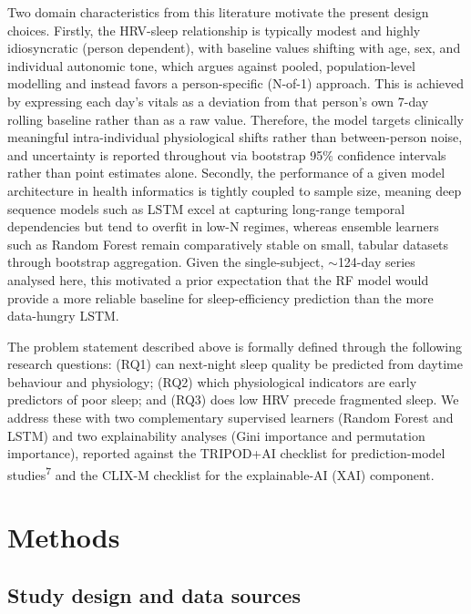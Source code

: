 \documentclass[fleqn,10pt]{wlscirep}
\begin{document}
Two domain characteristics from this literature motivate the present design choices. Firstly, the HRV-sleep relationship is typically modest and highly idiosyncratic (person dependent), with baseline values shifting with age, sex, and individual autonomic tone, which argues against pooled, population-level modelling and instead favors a person-specific (N-of-1) approach. This is achieved by expressing each day's vitals as a deviation from that person's own 7-day rolling baseline rather than as a raw value. Therefore, the model targets clinically meaningful intra-individual physiological shifts rather than between-person noise, and uncertainty is reported throughout via bootstrap 95\% confidence intervals rather than point estimates alone. Secondly, the performance of a given model architecture in health informatics is tightly coupled to sample size, meaning deep sequence models such as LSTM excel at capturing long-range temporal dependencies but tend to overfit in low-N regimes, whereas ensemble learners such as Random Forest remain comparatively stable on small, tabular datasets through bootstrap aggregation. Given the single-subject, $\sim$124-day series analysed here, this motivated a prior expectation that the RF model would provide a more reliable baseline for sleep-efficiency prediction than the more data-hungry LSTM.

The problem statement described above is formally defined through the following research questions: (RQ1) can next-night sleep quality be predicted from daytime behaviour and physiology; (RQ2) which physiological indicators are early predictors of poor sleep; and (RQ3) does low HRV precede fragmented sleep. We address these with two complementary supervised learners (Random Forest and LSTM) and two explainability analyses (Gini importance and permutation importance), reported against the TRIPOD+AI checklist for prediction-model studies\textsuperscript{7} and the CLIX-M checklist for the explainable-AI (XAI) component.

\section*{Methods}

\subsection*{Study design and data sources}
\end{document}
